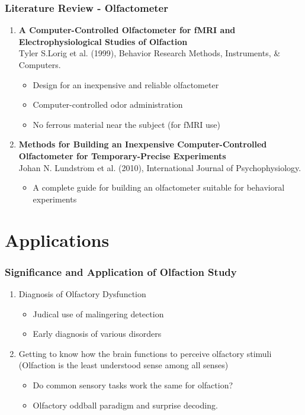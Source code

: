 \documentclass{beamer}
\newcounter{saveenumi}
\newcommand{\conti}{\setcounter{enumi}{\value{saveenumi}}}
\begin{document}
\begin{frame}
\frametitle{Literature Review - Olfactometer}
\begin{enumerate}
	\conti
	\item \textrm{\textbf{A Computer-Controlled Olfactometer for fMRI and Electrophysiological Studies of Olfaction}}
	\\
	Tyler S.Lorig et al. (1999), Behavior Research Methods, Instruments, \& Computers.
	\begin{itemize}
		\item
		Design for an inexpensive and reliable olfactometer
		\item
		Computer-controlled odor administration
		\item
		No ferrous material near the subject (for fMRI use)
	\end{itemize}
	\item \textrm{\textbf{Methods for Building an Inexpensive Computer-Controlled Olfactometer for Temporary-Precise Experiments}}
	\\
	Johan N. Lundstr$\ddot{\textrm{o}}$m et al. (2010), International Journal of Psychophysiology.
	\begin{itemize}
		\item
		A complete guide for building an olfactometer suitable for behavioral experiments
	\end{itemize}
	
\end{enumerate}
\end{frame}


\section{Applications} 
\begin{frame}
	\frametitle{Significance and Application of Olfaction Study}
	\begin{enumerate}
		\item
		Diagnosis of Olfactory Dysfunction
		\begin{itemize}
			\item
			Judical use of malingering detection
			\item 
			Early diagnosis of various disorders
		\end{itemize}
		\vspace{0.5cm}
		\item
		Getting to know how the brain functions to perceive olfactory stimuli (Olfaction is the least understood sense among all senses)
		\begin{itemize}
			\item
			Do common sensory tasks work the same for olfaction?
			\item 
			Olfactory oddball paradigm and surprise decoding.
		\end{itemize}
	\end{enumerate}
\end{frame}
\end{document}
